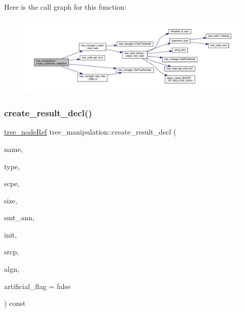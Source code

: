 Here is the call graph for this function\+:
\nopagebreak
\begin{figure}[H]
\begin{center}
\leavevmode
\includegraphics[width=350pt]{d0/d99/classtree__manipulation_aa9849e14cb81af9fc59f6e018cba6290_cgraph}
\end{center}
\end{figure}
\mbox{\label{classtree__manipulation_a7e9adc5785c0b55a5720e70fd7967a35}} 
\subsubsection{\texorpdfstring{create\+\_\+result\+\_\+decl()}{create\_result\_decl()}}
{\footnotesize\ttfamily \hyperlink{tree__node_8hpp_a6ee377554d1c4871ad66a337eaa67fd5}{tree\+\_\+node\+Ref} tree\+\_\+manipulation\+::create\+\_\+result\+\_\+decl (\begin{DoxyParamCaption}\item[{const \hyperlink{tree__node_8hpp_a6ee377554d1c4871ad66a337eaa67fd5}{tree\+\_\+node\+Ref} \&}]{name,  }\item[{const \hyperlink{tree__node_8hpp_a6ee377554d1c4871ad66a337eaa67fd5}{tree\+\_\+node\+Ref} \&}]{type,  }\item[{const \hyperlink{tree__node_8hpp_a6ee377554d1c4871ad66a337eaa67fd5}{tree\+\_\+node\+Ref} \&}]{scpe,  }\item[{const \hyperlink{tree__node_8hpp_a6ee377554d1c4871ad66a337eaa67fd5}{tree\+\_\+node\+Ref} \&}]{size,  }\item[{const \hyperlink{tree__node_8hpp_a6ee377554d1c4871ad66a337eaa67fd5}{tree\+\_\+node\+Ref} \&}]{smt\+\_\+ann,  }\item[{const \hyperlink{tree__node_8hpp_a6ee377554d1c4871ad66a337eaa67fd5}{tree\+\_\+node\+Ref} \&}]{init,  }\item[{const std\+::string \&}]{srcp,  }\item[{unsigned int}]{algn,  }\item[{bool}]{artificial\+\_\+flag = {\ttfamily false} }\end{DoxyParamCaption}) const}



